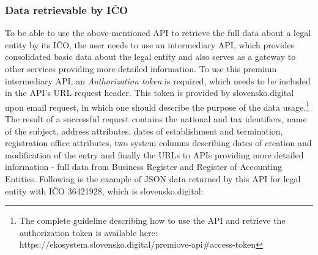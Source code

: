 \documentclass[thesis=B,english]{FITthesis}[2012/06/26]
\begin{document}
	\subsubsection{Data retrievable by IČO}
	To be able to use the above-mentioned API to retrieve the full data about a legal entity by its IČO, the user needs to use an intermediary API, which provides consolidated basic data about the legal entity and also serves as a gateway to other services providing more detailed information. To use this premium intermediary API, an \textit{Authorization token} is required, which needs to be included in the API's URL request header. This token is provided by slovensko.digital upon email request, in which one should describe the purpose of the data usage.\footnote{ The complete guideline describing how to use the API and retrieve the authorization token is available here: https://ekosystem.slovensko.digital/premiove-api\#access-token} The result of a successful request contains the national and tax identifiers, name of the subject, address attributes, dates of establishment and termination, registration office attributes, two system columns describing dates of creation and modification of the entry and finally the URLs to APIs providing more detailed information - full data from Business Register and Register of Accounting Entities. Following is the example of JSON data returned by this API for legal entity with IČO 36421928, which is slovensko.digital:
\end{document}
